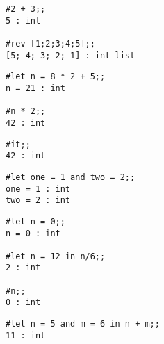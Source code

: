 
\begin{session}\begin{verbatim}
#2 + 3;;   
5 : int

#rev [1;2;3;4;5];;
[5; 4; 3; 2; 1] : int list
\end{verbatim}\end{session}


\begin{session}\begin{verbatim}
#let n = 8 * 2 + 5;;
n = 21 : int

#n * 2;;
42 : int
\end{verbatim}\end{session}


\begin{session}\begin{verbatim}
#it;;
42 : int
\end{verbatim}\end{session}



\begin{session}\begin{verbatim}
#let one = 1 and two = 2;;
one = 1 : int
two = 2 : int
\end{verbatim}\end{session}


\begin{session}\begin{verbatim}
#let n = 0;;
n = 0 : int

#let n = 12 in n/6;;
2 : int

#n;;
0 : int
\end{verbatim}\end{session}


\begin{session}\begin{verbatim}
#let n = 5 and m = 6 in n + m;;
11 : int
\end{verbatim}\end{session}



